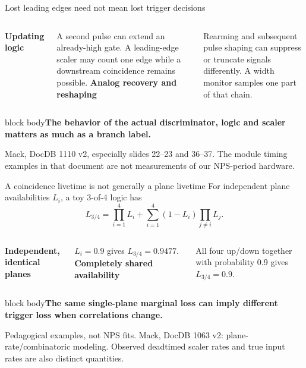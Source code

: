 \documentclass[aspectratio=169,11pt]{beamer}
\newcommand{\source}[1]{\par\vfill{\scriptsize\color{muted}#1\par}}
\newcommand{\takeaway}[1]{\begin{beamercolorbox}[sep=2.5mm,wd=\linewidth]{block body}\textbf{#1}\end{beamercolorbox}}
\begin{document}
\begin{frame}{Lost leading edges need not mean lost trigger decisions}
\begin{columns}[T]
\textbf{Updating logic}
\small\par A second pulse can extend an already-high gate. A leading-edge scaler may count one edge while a downstream coincidence remains possible.
\textbf{Analog recovery and reshaping}
\small\par Rearming and subsequent pulse shaping can suppress or truncate signals differently. A width monitor samples one part of that chain.
\end{columns}
\vspace{5mm}\takeaway{The behavior of the actual discriminator, logic and scaler matters as much as a branch label.}
\source{Mack, DocDB 1110 v2, especially slides 22--23 and 36--37. The module timing examples in that document are not measurements of our NPS-period hardware.}
\end{frame}

\begin{frame}{A coincidence livetime is not generally a plane livetime}
\small For independent plane availabilities $L_i$, a toy 3-of-4 logic has
\[L_{3/4}=\prod_{i=1}^{4}L_i+\sum_{i=1}^{4}(1-L_i)\prod_{j\ne i}L_j.\]
\begin{columns}[T]
\textbf{Independent, identical planes}\par
$L_i=0.9$ gives $L_{3/4}=0.9477$.
\textbf{Completely shared availability}\par
All four up/down together with probability 0.9 gives $L_{3/4}=0.9$.
\end{columns}
\vspace{4mm}\takeaway{The same single-plane marginal loss can imply different trigger loss when correlations change.}
\source{Pedagogical examples, not NPS fits. Mack, DocDB 1063 v2: plane-rate/combinatoric modeling. Observed deadtimed scaler rates and true input rates are also distinct quantities.}
\end{frame}
\end{document}
